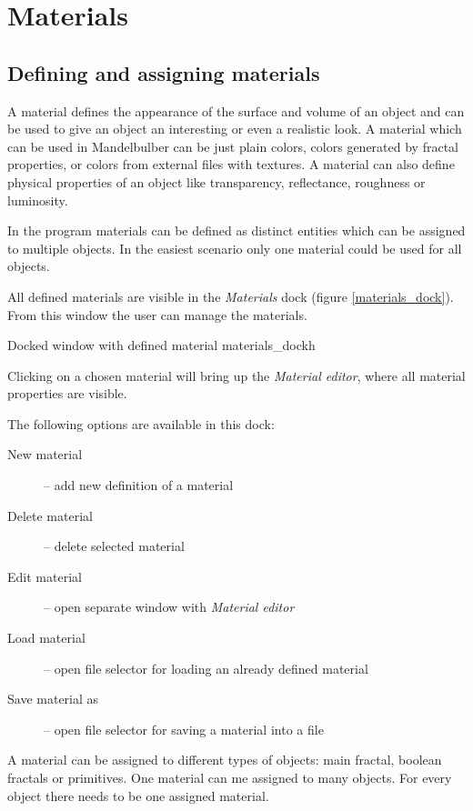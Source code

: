 \section{Materials}\label{materials}

\subsection{Defining and assigning materials}\label{defining-materials}

A material defines the appearance of the surface and volume of an object and can be used to give an object an interesting or even a realistic look. A material which can be used in Mandelbulber can be just plain colors, colors generated by fractal properties, or colors from external files with textures. A material can also define physical properties of an object like transparency, reflectance, roughness or luminosity.

In the program materials can be defined as distinct entities which can be assigned to multiple objects. In the easiest scenario only one material could be used for all objects.

All defined materials are visible in the \emph{Materials} dock (figure \ref{materials_dock}).
From this window the user can manage the materials.

{Docked window with defined material}
{materials_dock}{h}

Clicking on a chosen material will bring up the \emph{Material editor}, where all material properties are visible.

The following options are available in this dock:

\begin{description}
		\item[New material] -- add new definition of a material
		\item[Delete material] -- delete selected material
		\item[Edit material] -- open separate window with \emph{Material editor}
		\item[Load material] -- open file selector for loading an already defined material
		\item[Save material as] -- open file selector for saving a material into a file
\end{description}

A material can be assigned to different types of objects: main fractal, boolean fractals or primitives. One material can me assigned to many objects. For every object there needs to be one assigned material.

